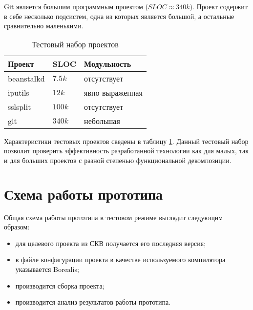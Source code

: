 Git является большим программным проектом ($SLOC \approx 340k$). Проект содержит в себе несколько подсистем, одна из которых является большой, а остальные сравнительно маленькими.

\begin{table}
	\caption{Тестовый набор проектов}
	\begin{center}
	\begin{tabular}{|l|l|l|}
	\hline 
	\textbf{Проект} & \textbf{SLOC} & \textbf{Модульность}	\\ 
	\hline 
	beanstalkd & $7.5k$ & отсутствует \\ 
	\hline 
	iputils & $12k$ & явно выраженная \\ 
	\hline 
	sslsplit & $100k$  & отсутствует \\ 
	\hline 
	git & $340k$ & небольшая \\ 
	\hline 
	\end{tabular} 
	\end{center}
	\label{table:testProjects}
\end{table}

Характеристики тестовых проектов сведены в таблицу \ref{table:testProjects}. Данный тестовый набор позволит проверить эффективность разработанной технологии как для малых, так и для больших проектов с разной степенью функциональной декомпозиции.

\section{Схема работы прототипа}
Общая схема работы прототипа в тестовом режиме выглядит следующим образом:
\begin{itemize}
\item для целевого проекта из СКВ получается его последняя версия;
\item в файле конфигурации проекта в качестве используемого компилятора указывается Borealis;
\item производится сборка проекта;
\item производится анализ результатов работы прототипа.
\end{itemize}

